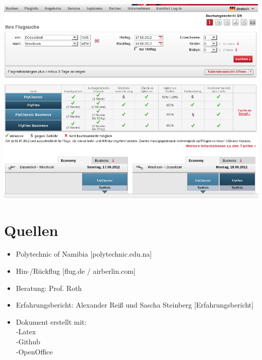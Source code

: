 \documentclass[11pt]{article}
\begin{document}
\includegraphics[scale=0.45]{Flug_Air_Berlin/Bildschirmfoto_am_2012-06-13_14_47_43.png} 

\section{Quellen}
\begin{itemize}

\item Polytechnic of Namibia  [polytechnic.edu.na]
\item Hin-/Rückflug [flug.de / airberlin.com]
\item Beratung: Prof. Roth
\item Erfahrungsbericht: Alexander Reiß und Sascha Steinberg [Erfahrungsbericht]
\item Dokument erstellt mit:
	\\-Latex
	\\-Github
	\\-OpenOffice 
\end{itemize}
\end{document}
